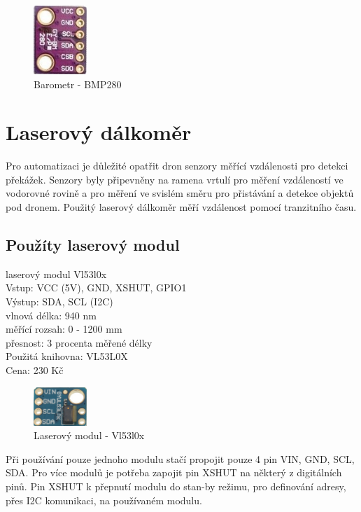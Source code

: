 \begin{figure}[h]
	\centering
	\includegraphics[width=2cm]{pictures/baro.jpg}
	\caption{Barometr - BMP280}
\end{figure}

\section{Laserový dálkoměr}
Pro automatizaci je důležité opatřit dron senzory měřící vzdálenosti pro detekci překážek. Senzory byly připevněny na ramena vrtulí pro měření vzdáleností ve vodorovné rovině a pro měření ve svislém směru pro přistávání a detekce objektů pod dronem. Použitý laserový dálkoměr měří vzdálenost pomocí tranzitního času.\\

\subsection{Použíty laserový modul}
laserový modul Vl53l0x\\
Vstup: VCC (5V), GND, XSHUT, GPIO1\\
Výstup: SDA, SCL (I2C)\\
vlnová délka: 940 nm\\
měřící rozsah: 0 - 1200 mm\\
přesnost: 3 procenta měřené délky\\
Použitá knihovna: VL53L0X\\
Cena: 230 Kč\\

\begin{figure}[h]
	\centering
	\includegraphics[width=2cm]{pictures/laser.jpg}
	\caption{Laserový modul - Vl53l0x}
\end{figure}

Při používání pouze jednoho modulu stačí propojit pouze 4 pin VIN, GND, SCL, SDA. Pro více modulů je potřeba zapojit pin XSHUT na některý z digitálních pinů. Pin XSHUT k přepnutí modulu do stan-by režimu, pro definování adresy, přes I2C komunikaci, na používaném modulu.

